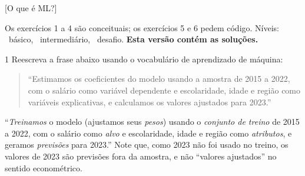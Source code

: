 \documentclass[lista]{tmlnotas}
\begin{document}
[O que é ML?]

\noindent Os exercícios 1 a 4 são conceituais; os exercícios 5 e 6 pedem código.
Níveis: ~básico, ~intermediário, ~desafio.
\ifsolucao\textbf{Esta versão contém as soluções.}\fi

\begin{exercicio}{1}
Reescreva a frase abaixo usando o vocabulário de aprendizado de máquina:
\begin{quote}
``Estimamos os coeficientes do modelo usando a amostra de 2015 a 2022, com o
salário como variável dependente e escolaridade, idade e região como
variáveis explicativas, e calculamos os valores ajustados para 2023.''
\end{quote}
\end{exercicio}
\begin{solucao}
``\emph{Treinamos} o modelo (ajustamos seus \emph{pesos}) usando o
\emph{conjunto de treino} de 2015 a 2022, com o salário como \emph{alvo} e
escolaridade, idade e região como \emph{atributos}, e geramos
\emph{previsões} para 2023.'' Note que, como 2023 não foi usado no treino, os
valores de 2023 são previsões fora da amostra, e não ``valores ajustados'' no
sentido econométrico.
\end{solucao}
\end{document}
